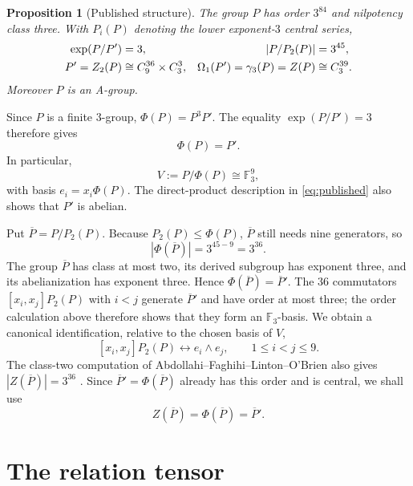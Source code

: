 \documentclass[11pt]{amsart}
\newtheorem{proposition}[theorem]{Proposition}
\theoremstyle{definition}
\theoremstyle{remark}
\newcommand{\F}{\mathbb F}
\begin{document}
\begin{proposition}[Published structure]\label{prop:published}
The group $P$ has order $3^{84}$ and nilpotency class three.  With
$P_i(P)$ denoting the lower exponent-$3$ central series,
\begin{align}
 \exp(P/P')&=3, & |P/P_2(P)|&=3^{45},\notag\\
 P'=Z_2(P)&\cong C_9^{36}\times C_3^3,
 & \Omega_1(P')=\gamma_3(P)=Z(P)&\cong C_3^{39}.\label{eq:published}
\end{align}
Moreover $P$ is an A-group.
\end{proposition}

Since $P$ is a finite $3$-group,
$\Phi(P)=P^3P'$.  The equality $\exp(P/P')=3$ therefore gives
\begin{equation}\label{eq:phi}
                              \Phi(P)=P'.
\end{equation}
In particular,
\[
                       V:=P/\Phi(P)\cong\F_3^9,
\]
with basis $e_i=x_i\Phi(P)$.  The direct-product description in
\eqref{eq:published} also shows that $P'$ is abelian.

Put $\overline P=P/P_2(P)$.  Because $P_2(P)\leq\Phi(P)$,
$\overline P$ still needs nine generators, so
\[
 |\Phi(\overline P)|=3^{45-9}=3^{36}.
\]
The group $\overline P$ has class at most two, its derived subgroup has
exponent three, and its abelianization has exponent three.  Hence
$\Phi(\overline P)=\overline P'$.  The $36$ commutators
$[x_i,x_j]P_2(P)$ with $i<j$ generate $\overline P'$ and have order at
most three; the order calculation above therefore shows that they form an
$\F_3$-basis.  We obtain a canonical identification, relative to the
chosen basis of $V$,
\begin{equation}\label{eq:wedge-id}
 [x_i,x_j]P_2(P)\longleftrightarrow e_i\wedge e_j,
 \qquad 1\le i<j\le9.
\end{equation}
The class-two computation of Abdollahi--Faghihi--Linton--O'Brien also gives
$|Z(\overline P)|=3^{36}$ \cite[Lemma~3.1 and p.~5]{AFLObrien10}.
Since $\overline P'=\Phi(\overline P)$ already has this order and is
central, we shall use
\begin{equation}\label{eq:centerbar}
 Z(\overline P)=\Phi(\overline P)=\overline P'.
\end{equation}

\section{The relation tensor}\label{sec:tensor}
\end{document}
